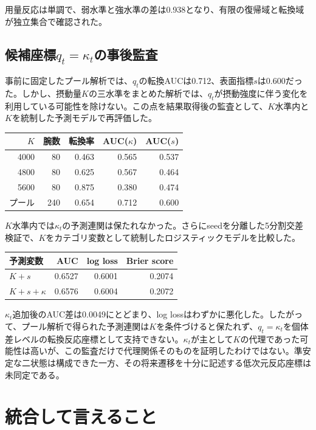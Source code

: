 \documentclass[11pt,a4paper]{ltjsarticle}
\begin{document}
用量反応は単調で、弱水準と強水準の差は0.938となり、有限の復帰域と転換域が独立集合で確認された。

\subsection{候補座標\texorpdfstring{$q_t=\kappa_t$}{q = kappa}の事後監査}

事前に固定したプール解析では、$q_t$の転換AUCは0.712、表面指標$s$は0.600だった。しかし、摂動量$K$の三水準をまとめた解析では、$q_t$が摂動強度に伴う変化を利用している可能性を除けない。この点を結果取得後の監査として、$K$水準内と$K$を統制した予測モデルで再評価した。

\begin{center}\small
\begin{tabular}{rrrrr}
\toprule
$K$ & 腕数 & 転換率 & AUC($\kappa$) & AUC($s$)\\\midrule
4000 & 80 & 0.463 & 0.565 & 0.537\\
4800 & 80 & 0.625 & 0.567 & 0.464\\
5600 & 80 & 0.875 & 0.380 & 0.474\\
プール & 240 & 0.654 & 0.712 & 0.600\\\bottomrule
\end{tabular}
\end{center}

$K$水準内では$\kappa_t$の予測連関は保たれなかった。さらにseedを分離した5分割交差検証で、$K$をカテゴリ変数として統制したロジスティックモデルを比較した。

\begin{center}\small
\begin{tabular}{lrrr}
\toprule
予測変数 & AUC & log loss & Brier score\\\midrule
$K+s$ & 0.6527 & 0.6001 & 0.2074\\
$K+s+\kappa$ & 0.6576 & 0.6004 & 0.2072\\\bottomrule
\end{tabular}
\end{center}

$\kappa_t$追加後のAUC差は0.0049にとどまり、log lossはわずかに悪化した。したがって、プール解析で得られた予測連関は$K$を条件づけると保たれず、$q_t=\kappa_t$を個体差レベルの転換反応座標として支持できない。$\kappa_t$が主として$K$の代理であった可能性は高いが、この監査だけで代理関係そのものを証明したわけではない。準安定な二状態は構成できた一方、その将来遷移を十分に記述する低次元反応座標は未同定である。

\section{統合して言えること}
\end{document}

